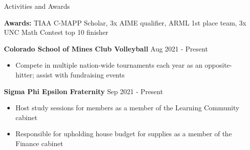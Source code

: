 \documentclass{resume} %
\begin{document}
\vspace{-6pt}



\begin{rSection}{Activities and Awards} 

\textbf{Awards:} TIAA C-MAPP Scholar, 3x AIME qualifier, ARML 1st place team, 3x UNC Math Contest top 10 finisher
\vspace{-4pt}

\textbf{Colorado School of Mines Club Volleyball} \hfill Aug 2021 - Present
\vspace{-6pt}
 \begin{itemize}
    \itemsep -6pt {} 
     \item Compete in multiple nation-wide tournaments each year as an opposite-hitter; assist with fundraising events
 \end{itemize}
\vspace{-4pt}

\textbf{Sigma Phi Epsilon Fraternity} \hfill Sep 2021 - Present
\vspace{-6pt}
 \begin{itemize}
    \itemsep -6pt {} 
     \item Host study sessions for members as a member of the Learning Community cabinet
     \item Responsible for upholding house budget for supplies as a member of the Finance cabinet
 \end{itemize}
 \vspace{-4pt}
 

\vspace{-4pt}

\end{rSection}
\end{document}
